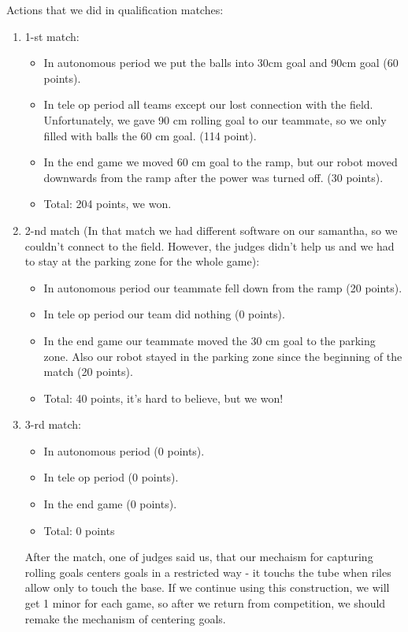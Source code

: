 Actions that we did in qualification matches:
\begin{enumerate}
	\item 1-st match:
	\begin{itemize}
		\item In autonomous period we put the balls into 30cm goal and 90cm goal (60 points).
		
		\item In tele op period all teams except our lost connection with the field. Unfortunately, we gave 90 cm rolling goal to our teammate, so we only filled with balls the 60 cm goal. (114 point).
		
		\item In the end game we moved 60 cm goal to the ramp, but our robot moved downwards from the ramp after the power was turned off. (30 points).
		
		\item Total: 204 points, we won. 
	\end{itemize}
	\item 2-nd match (In that match we had different software on our samantha, so we couldn't connect to the field. However, the judges didn't help us and we had to stay at the parking zone for the whole game):
	\begin{itemize}
		\item In autonomous period our teammate fell down from the ramp (20 points).
		
		\item In tele op period our team did nothing (0 points).
		
		\item In the end game our teammate moved the 30 cm goal to the parking zone. Also our robot stayed in the parking zone since the beginning of the match (20 points).
		
		\item Total: 40 points, it's hard to believe, but we won!
	\end{itemize}
	\item 3-rd match:
	\begin{itemize}
		\item In autonomous period (0 points).
		
		\item In tele op period (0 points).
		
		\item In the end game  (0 points).
		
		\item Total: 0 points
	\end{itemize}
	After the match, one of judges said us, that our mechaism for capturing rolling goals centers goals in a restricted way - it touchs the tube when riles allow only to touch the base. If we continue using this construction, we will get 1 minor for each game, so after we return from competition, we should remake the mechanism of centering goals.
\end{enumerate}


